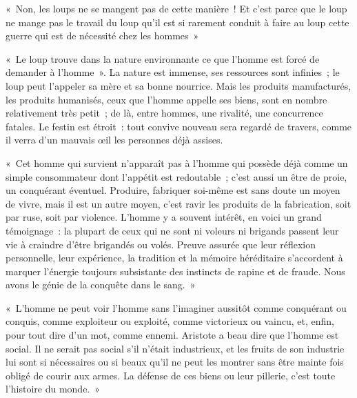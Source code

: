 \documentclass[french,twoside]{book} %
\newcommand{\astermono}{\medskip\centerline{\color{rubric}\large\selectfont{\syms ✻}}\medskip\par}%
\begin{document}
« Non, les loups ne se mangent pas de cette manière ! Et c’est parce que le loup ne mange pas le travail du loup qu’il est si rarement conduit à faire au loup cette guerre qui est de nécessité chez les hommes »\par
« Le loup trouve dans la nature environnante ce que l’homme est forcé de demander à l’homme ». La nature est immense, ses ressources sont infinies ; le loup peut l’appeler sa mère et sa bonne nourrice. Mais les produits manufacturés, les produits humanisés, ceux que l’homme appelle ses biens, sont en nombre relativement très petit ; de là, entre hommes, une rivalité, une concurrence fatales. Le festin est étroit : tout convive nouveau sera regardé de travers, comme il verra d’un mauvais œil les personnes déjà assises.\par
« Cet homme qui survient n’apparaît pas à l’homme qui possède déjà comme un simple consommateur dont l’appétit est redoutable ; c’est aussi un être de proie, un conquérant éventuel. Produire, fabriquer soi-même est sans doute un moyen de vivre, mais il est un autre moyen, c’est ravir les produits de la fabrication, soit par ruse, soit par violence. L’homme y a souvent intérêt, en voici un grand témoignage : la plupart de ceux qui ne sont ni voleurs ni brigands passent leur vie à craindre d’être brigandés ou volés. Preuve assurée que leur réflexion personnelle, leur expérience, la tradition et la mémoire héréditaire s’accordent à marquer l’énergie toujours subsistante des instincts de rapine et de fraude. Nous avons le génie de la conquête dans le sang. »\par
« L’homme ne peut voir l’homme sans l’imaginer aussitôt comme conquérant ou conquis, comme exploiteur ou exploité, comme victorieux ou vaincu, et, enfin, pour tout dire d’un mot, comme ennemi. Aristote a beau dire que l’homme est social. Il ne serait pas social s’il n’était industrieux, et les fruits de son industrie lui sont si nécessaires ou si beaux qu’il ne peut les montrer sans être mainte fois obligé de courir aux armes. La défense de ces biens ou leur pillerie, c’est toute l’histoire du monde. »\par

\astermono
\end{document}
